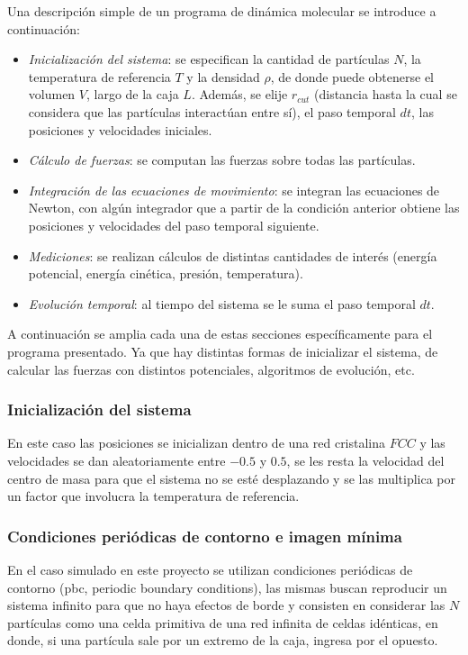 \documentclass[a4paper,spanish,12pt,twoside]{article}
\begin{document}
Una descripción simple de un programa de dinámica molecular se introduce a continuación:

\begin{itemize}
 \item \textit{Inicialización del sistema}: se especifican la cantidad de partículas $N$, la temperatura de referencia $T$ y la densidad $\rho$, de donde puede obtenerse el volumen $V$, largo de la caja $L$. Además, se elije $r_{cut}$ (distancia hasta la cual se considera que las partículas interactúan entre sí), el paso temporal $dt$, las posiciones y velocidades iniciales.
 \item \textit{Cálculo de fuerzas}: se computan las fuerzas sobre todas las partículas.
 \item \textit{Integración de las ecuaciones de movimiento}: se integran las ecuaciones de Newton, con algún integrador que a partir de la condición anterior obtiene las posiciones y velocidades del paso temporal siguiente.
 \item \textit{Mediciones}: se realizan cálculos de distintas cantidades de interés (energía potencial, energía cinética, presión, temperatura).
 \item \textit{Evolución temporal}: al tiempo del sistema se le suma el paso temporal $dt$.
\end{itemize}

A continuación se amplia cada una de estas secciones específicamente para el programa presentado. Ya que hay distintas formas de inicializar el sistema, de calcular las fuerzas con distintos potenciales, algoritmos de evolución, etc.

\subsubsection{Inicialización del sistema}

En este caso las posiciones se inicializan dentro de una red cristalina $FCC$ y las velocidades se dan aleatoriamente entre $-0.5$ y $0.5$, se les resta la velocidad del centro de masa para que el sistema no se esté desplazando y se las multiplica por un factor que involucra la temperatura de referencia.


\subsubsection{Condiciones periódicas de contorno e imagen mínima}

En el caso simulado en este proyecto se utilizan condiciones periódicas de contorno (pbc, periodic boundary conditions), las mismas buscan reproducir un sistema infinito para que no haya efectos de borde y consisten en considerar las $N$ partículas como una celda primitiva de una red infinita de celdas idénticas, en donde, si una partícula sale por un extremo de la caja, ingresa por el opuesto.
\end{document}
